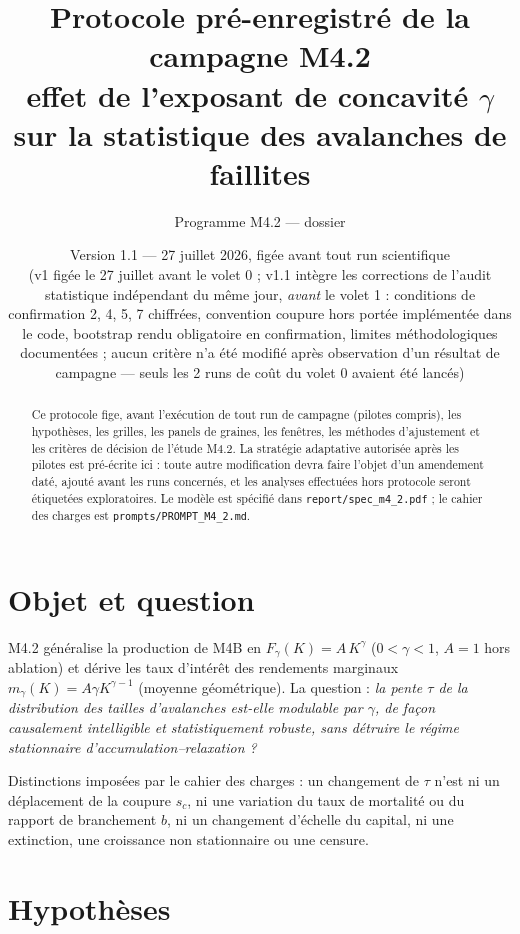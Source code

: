 \documentclass[11pt,a4paper]{article}
\title{Protocole pré-enregistré de la campagne M4.2\\
\large effet de l'exposant de concavité $\gamma$ sur la statistique des
avalanches de faillites}
\author{Programme M4.2 --- dossier \code{m4\_2\_credit\_soc}}
\date{Version 1.1 --- 27 juillet 2026, figée avant tout run scientifique\\
\normalsize (v1 figée le 27 juillet avant le volet 0 ; v1.1 intègre les
corrections de l'audit statistique indépendant du même jour, \emph{avant}
le volet 1 : conditions de confirmation 2, 4, 5, 7 chiffrées, convention
\og coupure hors portée \fg{} implémentée dans le code, bootstrap rendu
obligatoire en confirmation, limites méthodologiques documentées ;
aucun critère n'a été modifié après observation d'un résultat de
campagne --- seuls les 2 runs de coût du volet 0 avaient été lancés)}
\newcommand{\code}[1]{\texttt{#1}}
\begin{document}
\maketitle

\begin{abstract}
Ce protocole fige, avant l'exécution de tout run de campagne (pilotes
compris), les hypothèses, les grilles, les panels de graines, les fenêtres,
les méthodes d'ajustement et les critères de décision de l'étude M4.2. La
stratégie adaptative autorisée après les pilotes est pré-écrite ici : toute
autre modification devra faire l'objet d'un amendement daté, ajouté avant
les runs concernés, et les analyses effectuées hors protocole seront
étiquetées exploratoires. Le modèle est spécifié dans
\code{report/spec\_m4\_2.pdf} ; le cahier des charges est
\code{prompts/PROMPT\_M4\_2.md}.
\end{abstract}

\tableofcontents

\section{Objet et question}

M4.2 généralise la production de M4B en $F_\gamma(K)=A\,K^\gamma$
($0<\gamma<1$, $A=1$ hors ablation) et dérive les taux d'intérêt des
rendements marginaux $m_\gamma(K)=A\gamma K^{\gamma-1}$ (moyenne
géométrique). La question : \emph{la pente $\tau$ de la distribution des
tailles d'avalanches est-elle modulable par $\gamma$, de façon causalement
intelligible et statistiquement robuste, sans détruire le régime
stationnaire d'accumulation--relaxation ?}

Distinctions imposées par le cahier des charges : un changement de $\tau$
n'est ni un déplacement de la coupure $s_c$, ni une variation du taux de
mortalité ou du rapport de branchement $b$, ni un changement d'échelle du
capital, ni une extinction, une croissance non stationnaire ou une censure.

\section{Hypothèses}
\end{document}
